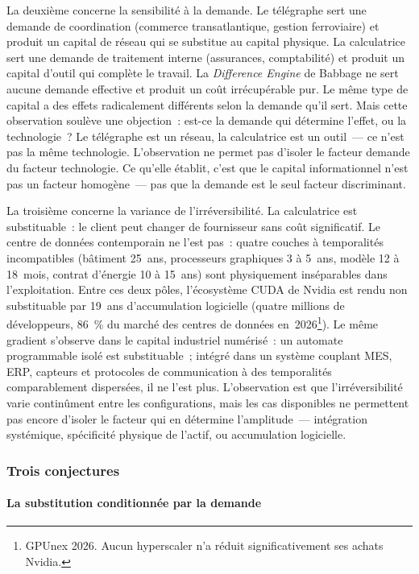 La deuxième concerne la sensibilité à la demande. Le télégraphe sert une demande de coordination (commerce transatlantique, gestion ferroviaire) et produit un capital de réseau qui se substitue au capital physique. La calculatrice sert une demande de traitement interne (assurances, comptabilité) et produit un capital d'outil qui complète le travail. La \emph{Difference Engine} de Babbage ne sert aucune demande effective et produit un coût irrécupérable pur. Le même type de capital a des effets radicalement différents selon la demande qu'il sert. Mais cette observation soulève une objection~: est-ce la demande qui détermine l'effet, ou la technologie~? Le télégraphe est un réseau, la calculatrice est un outil~--- ce n'est pas la même technologie. L'observation ne permet pas d'isoler le facteur demande du facteur technologie. Ce qu'elle établit, c'est que le capital informationnel n'est pas un facteur homogène~--- pas que la demande est le seul facteur discriminant.

La troisième concerne la variance de l'irréversibilité. La calculatrice est substituable~: le client peut changer de fournisseur sans coût significatif. Le centre de données contemporain ne l'est pas~: quatre couches à temporalités incompatibles (bâtiment 25~ans, processeurs graphiques 3 à 5~ans, modèle 12 à 18~mois, contrat d'énergie 10 à 15~ans) sont physiquement inséparables dans l'exploitation. Entre ces deux pôles, l'écosystème CUDA de Nvidia est rendu non substituable par 19~ans d'accumulation logicielle (quatre millions de développeurs, 86~\% du marché des centres de données en~2026\footnote{GPUnex 2026. Aucun hyperscaler n'a réduit significativement ses achats Nvidia.}). Le même gradient s'observe dans le capital industriel numérisé~: un automate programmable isolé est substituable~; intégré dans un système couplant MES, ERP, capteurs et protocoles de communication à des temporalités comparablement dispersées, il ne l'est plus. L'observation est que l'irréversibilité varie continûment entre les configurations, mais les cas disponibles ne permettent pas encore d'isoler le facteur qui en détermine l'amplitude~--- intégration systémique, spécificité physique de l'actif, ou accumulation logicielle.


\subsubsection{Trois conjectures}


\paragraph{La substitution conditionnée par la demande}

